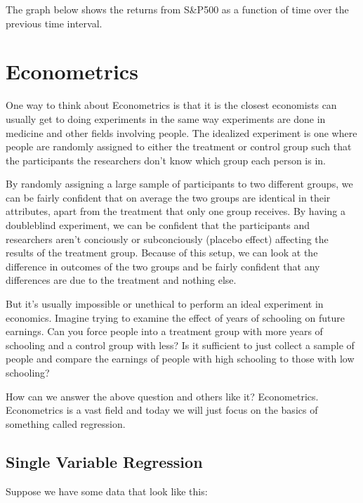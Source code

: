 \documentclass[letterpaper,10pt,english]{jupyterBook}
\begin{document}
\noindent{}

\sphinxAtStartPar
The graph below shows the returns from S\&P500 as a function of time over the previous time interval.

\sphinxAtStartPar
{}


\section{Econometrics}
\label{\detokenize{content/11-econometrics/index:econometrics}}\label{\detokenize{content/11-econometrics/index::doc}}
\sphinxAtStartPar
One way to think about Econometrics is that it is the closest economists can usually get to doing experiments in the same way experiments are done in medicine and other fields involving people. The idealized experiment is one where people are randomly assigned to either the treatment or control group such that the participants  the researchers don’t know which group each person is in.

\sphinxAtStartPar
By randomly assigning a large sample of participants to two different groups, we can be fairly confident that on average the two groups are identical in their attributes, apart from the treatment that only one group receives. By having a double\sphinxhyphen{}blind experiment, we can be confident that the participants and researchers aren’t conciously or subconciously (placebo effect) affecting the results of the treatment group. Because of this setup, we can look at the difference in outcomes of the two groups and be fairly confident that any differences are due to the treatment and nothing else.

\sphinxAtStartPar
But it’s usually impossible or unethical to perform an ideal experiment in economics. Imagine trying to examine the effect of years of schooling on future earnings. Can you force people into a treatment group with more years of schooling and a control group with less? Is it sufficient to just collect a sample of people and compare the earnings of people with high schooling to those with low schooling?

\sphinxAtStartPar
How can we answer the above question and others like it? Econometrics. Econometrics is a vast field and today we will just focus on the basics of something called regression.


\subsection{Single Variable Regression}
\label{\detokenize{content/11-econometrics/single-variable:single-variable-regression}}\label{\detokenize{content/11-econometrics/single-variable::doc}}
\sphinxAtStartPar
Suppose we have some data that look like this:
\end{document}
